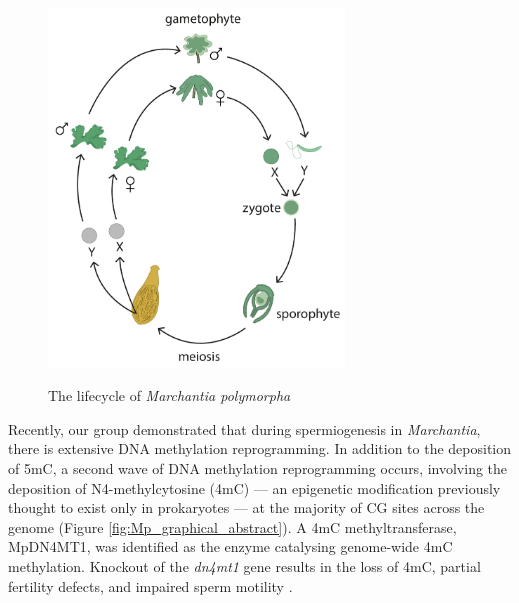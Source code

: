 \begin{figure}[htbp!] 
\centering    
    \includegraphics[width=0.7\textwidth]{Chapter3/Figs/Intro/Marchantia_lifecycle.pdf}
\caption{The lifecycle of \textit{Marchantia polymorpha}}
\label{fig:Mp_lifecycle}
\captionsetup{font=small}
    \caption*{}
\end{figure}

Recently, our group demonstrated that during spermiogenesis in \textit{Marchantia}, there is extensive DNA methylation reprogramming. In addition to the deposition of 5mC, a second wave of DNA methylation reprogramming occurs, involving the deposition of N4-methylcytosine (4mC) — an epigenetic modification previously thought to exist only in prokaryotes — at the majority of CG sites across the genome (Figure \ref{fig:Mp_graphical_abstract}). A 4mC methyltransferase, MpDN4MT1, was identified as the enzyme catalysing genome-wide 4mC methylation. Knockout of the \textit{dn4mt1} gene results in the loss of 4mC, partial fertility defects, and impaired sperm motility \cite{RN189}.

